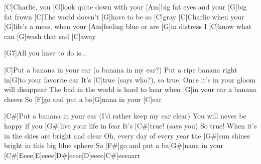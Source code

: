 


\begin{guitar}
	[C]Charlie, you [G]look quite down with your [Am]big fat eyes and your [G]big fat frown
	[C]The world doesn't [G]have to be so [C]gray
	[C]Charlie when your [G]life's a mess, when your [Am]feeling blue or are [G]in distress
	I [C]know what can [G]wash that sad [C]away
	
	[G7]All you have to do is...
	
	[C]Put a banana in your ear (a banana in my ear?)
	Put a ripe banana right in[G]to your favorite ear
	It's [C]true (says who?), so true. Once it's in your gloom will disappear
	The bad in the world is hard to hear when [G]in your ear a banana cheers
	So [F]go and put a ba[G]nana in your [C]ear
	
	[C#]Put a banana in your ear (I'd rather keep my ear clear)
	You will never be happy if you [G#]live your life in fear
	It's [C#]true! (says you) So true! When it's in the skies are bright and clear
	Oh, every day of every year the [G#]sun shines bright in this big blue sphere
	So [F#]go and put a ba[G#]nana in your
	[C#]Eeee[E]eeee[D#]eeee[D]eeee[C#]eeeaarr
	
\end{guitar}

